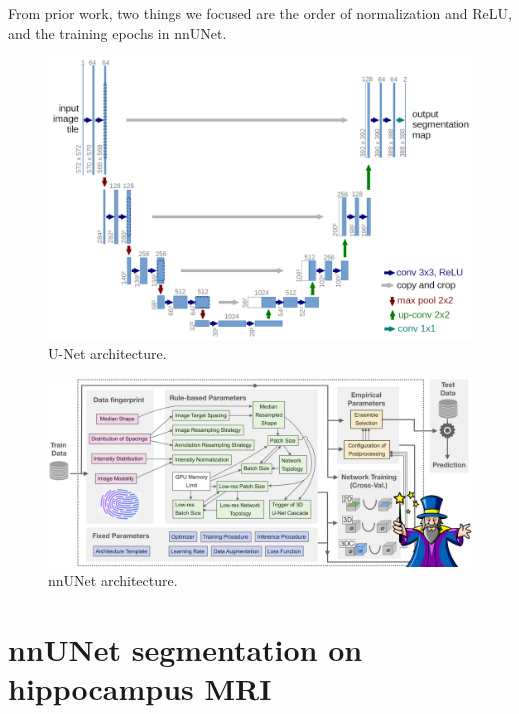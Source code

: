 \documentclass{article}
\begin{document}
From prior work, two things we focused are the order of normalization and ReLU, and the training epochs in nnUNet.

\begin{figure}
  \centering
  \includegraphics[scale=0.25]{./figs/unetarch.png}
  \caption{U-Net architecture.}
  \label{unetarch}
\end{figure}

\begin{figure}
  \centering
  \includegraphics[scale=0.28]{./figs/nnunetarch.png}
  \caption{nnUNet architecture.}
  \label{nnunetarch}
\end{figure}


\section{nnUNet segmentation on hippocampus MRI}
\end{document}

